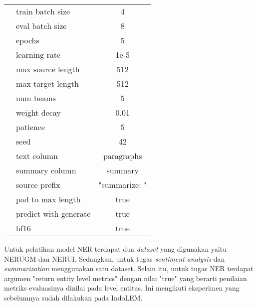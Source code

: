 \begin{table}[h]
\begin{tabular}{|c|l|c|}
                                                & train batch size & 4 \\ \cline{2-3}
                                                & eval batch size & 8 \\ \cline{2-3}
                                                & epochs & 5 \\ \cline{2-3}
                                                & learning rate & 1e-5 \\ \cline{2-3}
                                                & max source length & 512 \\ \cline{2-3}
                                                & max target length & 512 \\ \cline{2-3}
                                                & num beams & 5 \\ \cline{2-3}
                                                & weight decay & 0.01 \\ \cline{2-3}
                                                & patience & 5 \\ \cline{2-3}
                                                & seed & 42 \\ \cline{2-3}
                                                & text column & paragraphs \\ \cline{2-3}
                                                & summary column & summary \\ \cline{2-3}
                                                & source prefix & "summarize: " \\ \cline{2-3}
                                                & pad to max length & true \\ \cline{2-3}
                                                & predict with generate & true \\ \cline{2-3}
                                                & bf16 & true \\ \hline
    \end{tabular}
\end{table}

Untuk pelatihan model NER terdapat dua \textit{dataset} yang  digunakan yaitu NERUGM dan NERUI. Sedangkan, untuk tugas \textit{sentiment analysis} dan \textit{summarization} menggunakan satu dataset. Selain itu, untuk tugas NER terdapat argumen "return entity level metrics" dengan nilai "true" yang berarti penilaian metriks evaluasinya  dinilai pada level entitas. Ini mengikuti eksperimen yang sebelumnya sudah dilakukan pada IndoLEM.

